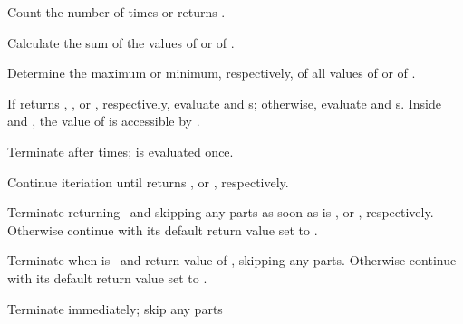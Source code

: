 \begin{LIST}{1cm}
\begin{LIST}{.5cm}
    {
    Count the number of times  or  returns \T.
    }

    {
    Calculate the sum of the values of  or of .
    }

    {
    Determine the maximum or minimum, respectively, of all values of
     or of . 
    }

    {
    If  returns \T, \T, or \NIL, respectively, evaluate
     and s; otherwise, evaluate 
    and s. Inside  and , the value
    of  is accessible by . 
    }

    {
    Terminate  after  times;  is evaluated once.
    }

    {
    Continue iteriation until  returns \NIL, or \T, respectively.
    }

    {
    Terminate  returning \NIL\ and skipping any
     parts as soon as  is \NIL, or \T,
    respectively. Otherwise continue  with its default return
    value set to \T. 
    }

    {
    Terminate  when  is \T\ and return value of , skipping any  parts. Otherwise continue  with its default return value set to \T.
    }

    {
    Terminate  immediately; skip any  parts
    }
  \end{LIST}
\end{LIST}




